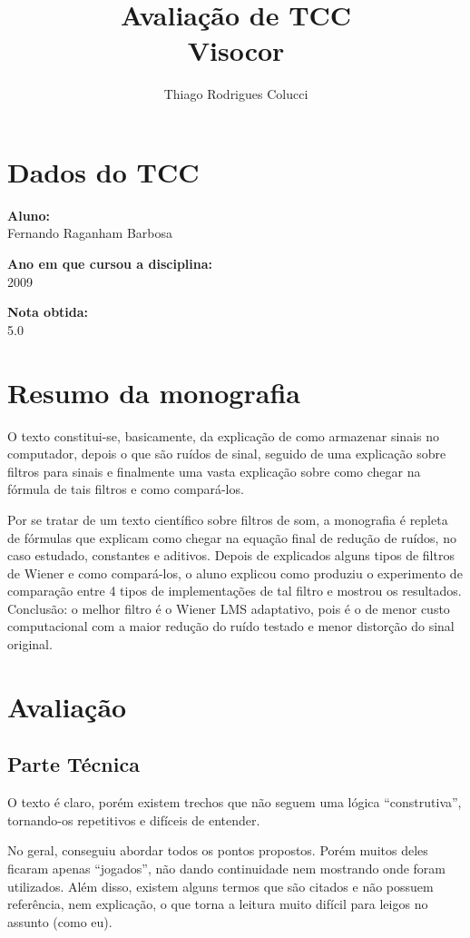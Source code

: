 \documentclass[12pt,a4paper]{article}
\title{Avaliação de TCC\\Visocor}
\author{Thiago Rodrigues Colucci}
\begin{document}
\maketitle

\newpage

\tableofcontents
\newpage
\section{Dados do TCC}
\textbf{Aluno:}\\
Fernando Raganham Barbosa

\textbf{Ano em que cursou a disciplina:}\\2009


\textbf{Nota obtida:}\\5.0


\section{Resumo da monografia}
O texto constitui-se, basicamente, da explicação de como armazenar sinais no computador, depois o que são ruídos de sinal, seguido de uma explicação sobre filtros para sinais e finalmente uma vasta explicação sobre como chegar na fórmula de tais filtros e como compará-los.

Por se tratar de um texto científico sobre filtros de som, a monografia é repleta de fórmulas que explicam como chegar na equação final de redução de ruídos, no caso estudado, constantes e aditivos. Depois de explicados alguns tipos de filtros de Wiener e como compará-los, o aluno explicou como produziu o experimento de comparação entre 4 tipos de implementações de tal filtro e mostrou os resultados. Conclusão: o melhor filtro é o Wiener LMS adaptativo, pois é o de menor custo computacional com a maior redução do ruído testado e menor distorção do sinal original.

\section{Avaliação}
\subsection{Parte Técnica}
O texto é claro, porém existem trechos que não seguem uma lógica ``construtiva'', tornando-os repetitivos e difíceis de entender.

No geral, conseguiu abordar todos os pontos propostos. Porém muitos deles ficaram apenas ``jogados'', não dando continuidade nem mostrando onde foram utilizados. Além disso, existem alguns termos que são citados e não possuem referência, nem explicação, o que torna a leitura muito difícil para leigos no assunto (como eu).
\end{document}
